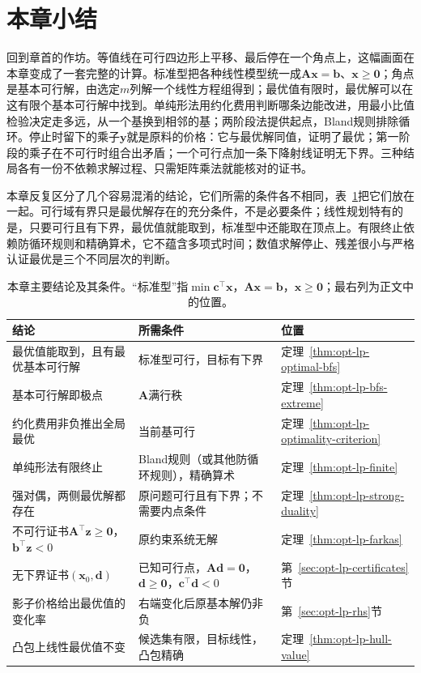 \section{本章小结}
\label{sec:opt-lp-summary}

回到章首的作坊。等值线在可行四边形上平移、最后停在一个角点上，这幅画面在本章变成了一套完整的计算。标准型把各种线性模型统一成$\bm A\bm x=\bm b$、$\bm x\ge\bm 0$；角点是基本可行解，由选定$m$列解一个线性方程组得到；最优值有限时，最优解可以在这有限个基本可行解中找到。单纯形法用约化费用判断哪条边能改进，用最小比值检验决定走多远，从一个基换到相邻的基；两阶段法提供起点，Bland规则排除循环。停止时留下的乘子$\bm y$就是原料的价格：它与最优解同值，证明了最优；第一阶段的乘子在不可行时组合出矛盾；一个可行点加一条下降射线证明无下界。三种结局各有一份不依赖求解过程、只需矩阵乘法就能核对的证书。

本章反复区分了几个容易混淆的结论，它们所需的条件各不相同，表~\ref{tab:opt-lp-summary}把它们放在一起。可行域有界只是最优解存在的充分条件，不是必要条件；线性规划特有的是，只要可行且有下界，最优值就能取到，标准型中还能取在顶点上。有限终止依赖防循环规则和精确算术，它不蕴含多项式时间；数值求解停止、残差很小与严格认证最优是三个不同层次的判断。

\begin{table}[!htbp]
  \centering
  \caption{本章主要结论及其条件。“标准型”指$\min\bm c^\top\bm x$，$\bm A\bm x=\bm b$，$\bm x\ge\bm 0$；最右列为正文中的位置。}
  \label{tab:opt-lp-summary}
  \begin{tabular}{@{}lll@{}}
    \toprule
    结论 & 所需条件 & 位置 \\
    \midrule
    最优值能取到，且有最优基本可行解 & 标准型可行，目标有下界 & 定理~\ref{thm:opt-lp-optimal-bfs} \\
    基本可行解即极点 & $\bm A$满行秩 & 定理~\ref{thm:opt-lp-bfs-extreme} \\
    约化费用非负推出全局最优 & 当前基可行 & 定理~\ref{thm:opt-lp-optimality-criterion} \\
    单纯形法有限终止 & Bland规则（或其他防循环规则），精确算术 & 定理~\ref{thm:opt-lp-finite} \\
    强对偶，两侧最优解都存在 & 原问题可行且有下界；不需要内点条件 & 定理~\ref{thm:opt-lp-strong-duality} \\
    不可行证书$\bm A^\top\bm z\ge\bm 0$，$\bm b^\top\bm z<0$ & 原约束系统无解 & 定理~\ref{thm:opt-lp-farkas} \\
    无下界证书$(\bm x_0,\bm d)$ & 已知可行点，$\bm A\bm d=\bm 0$，$\bm d\ge\bm 0$，$\bm c^\top\bm d<0$ & 第~\ref{sec:opt-lp-certificates}节 \\
    影子价格给出最优值的变化率 & 右端变化后原基本解仍非负 & 第~\ref{sec:opt-lp-rhs}节 \\
    凸包上线性最优值不变 & 候选集有限，目标线性，凸包精确 & 定理~\ref{thm:opt-lp-hull-value} \\
    \bottomrule
  \end{tabular}
\end{table}

